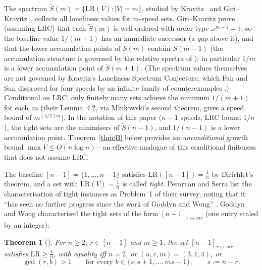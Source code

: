 \documentclass[11pt]{article}
\newtheorem{theorem}{Theorem}[section]
\theoremstyle{definition}
\newcommand{\LR}{\mathrm{LR}}
\begin{document}
The spectrum $\widetilde{S}(m)=\{\LR(V):\lvert V\rvert=m\}$, studied by
Kravitz~\cite{Kravitz2021} and Giri--Kravitz~\cite{GiriKravitz2026}, collects
all loneliness values for $m$-speed sets.  Giri--Kravitz prove (assuming LRC)
that each $\widetilde{S}(m)$ is well-ordered with order type $\omega^{m-1}+1$,
so the baseline value $1/(m+1)$ has an immediate successor (a \emph{gap} above
it), and that the lower accumulation points of $\widetilde{S}(m)$ contain
$\widetilde{S}(m-1)$ (the accumulation structure is governed by the
relative spectra of \cite{JainKravitz2024}); in particular $1/m$ is a lower
accumulation point of $\widetilde{S}(m+1)$.  (The spectrum values
themselves are not governed by Kravitz's Loneliness Spectrum Conjecture,
which Fan and Sun disproved for four speeds by an infinite family of
counterexamples \cite{FanSun2026}.)  Conditional on LRC, only finitely many sets achieve the
minimum $1/(m+1)$ for each~$m$ (their Lemma~4.2, via Minkowski's second
theorem, gives a speed bound of $m^{(5/2)m}$).  In the notation of this paper
($n-1$ speeds, LRC bound $1/n$), the tight sets are the minimisers of
$\widetilde{S}(n-1)$, and $1/(n-1)$ is a lower accumulation point.
Theorem~\ref{thm:B} below provides an \emph{unconditional} growth bound
$\max V\le O(n\log n)$---an effective analogue of this conditional finiteness
that does not assume LRC.

The baseline $[n-1]=\{1,\dots,n-1\}$ satisfies $\LR([n-1])=\frac1n$ by
Dirichlet's theorem, and a set with $\LR(V)=\frac1n$ is called \emph{tight}.
Perarnau and Serra list the characterisation of tight instances as
Problem~1 of their survey, noting that it ``has seen no further progress
since the work of Goddyn and Wong'' \cite{GoddynWong2006}. Goddyn and Wong
characterised the tight sets of the form $[n-1]_{r\mapsto mr}$ (one entry
scaled by an integer):

\begin{theorem}[{\cite[Thm.~2.3]{GoddynWong2006}}]\label{thm:GW}
For $n\ge2$, $r\in[n-1]$ and $m\ge1$, the set $[n-1]_{r\mapsto mr}$ satisfies
$\LR\ge\frac1n$, with equality iff $n=2$, or $(n,r,m)=(3,1,4)$, or
\begin{equation}\label{eq:gwcond}
\gcd(r,b)>1\qquad\text{for every } b\in\{s,s+1,\dots,ms-1\},\qquad s:=n-r.
\end{equation}
\end{theorem}
\end{document}
